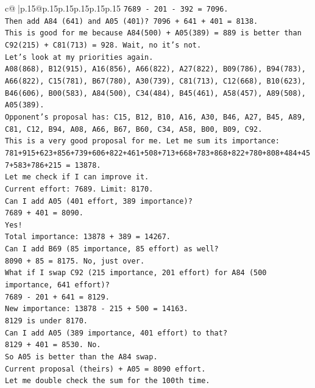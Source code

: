 \documentclass{article}
\begin{document}
{\begin{supertabular}{c@{$\;$}|p{.15\linewidth}@{}p{.15\linewidth}p{.15\linewidth}p{.15\linewidth}p{.15\linewidth}p{.15\linewidth}}
{{{\texttt{7689 {-} 201 {-} 392 = 7096.} \\
\texttt{Then add A84 (641) and A05 (401)? 7096 + 641 + 401 = 8138.} \\
\texttt{This is good for me because A84(500) + A05(389) = 889 is better than C92(215) + C81(713) = 928. Wait, no it's not.} \\
\texttt{Let's look at my priorities again.} \\
\texttt{A08(868), B12(915), A16(856), A66(822), A27(822), B09(786), B94(783), A66(822), C15(781), B67(780), A30(739), C81(713), C12(668), B10(623), B46(606), B00(583), A84(500), C34(484), B45(461), A58(457), A89(508), A05(389).} \\
\texttt{Opponent's proposal has: C15, B12, B10, A16, A30, B46, A27, B45, A89, C81, C12, B94, A08, A66, B67, B60, C34, A58, B00, B09, C92.} \\
\texttt{This is a very good proposal for me. Let me sum its importance:} \\
\texttt{781+915+623+856+739+606+822+461+508+713+668+783+868+822+780+808+484+457+583+786+215 = 13878.} \\
\texttt{Let me check if I can improve it.} \\
\texttt{Current effort: 7689. Limit: 8170.} \\
\texttt{Can I add A05 (401 effort, 389 importance)?} \\
\texttt{7689 + 401 = 8090.} \\
\texttt{Yes!} \\
\texttt{Total importance: 13878 + 389 = 14267.} \\
\texttt{Can I add B69 (85 importance, 85 effort) as well?} \\
\texttt{8090 + 85 = 8175. No, just over.} \\
\texttt{What if I swap C92 (215 importance, 201 effort) for A84 (500 importance, 641 effort)?} \\
\texttt{7689 {-} 201 + 641 = 8129.} \\
\texttt{New importance: 13878 {-} 215 + 500 = 14163.} \\
\texttt{8129 is under 8170.} \\
\texttt{Can I add A05 (389 importance, 401 effort) to that?} \\
\texttt{8129 + 401 = 8530. No.} \\
\texttt{So A05 is better than the A84 swap.} \\
\texttt{Current proposal (theirs) + A05 = 8090 effort.} \\
\texttt{Let me double check the sum for the 100th time.} \\
}}}
\end{supertabular}}
\end{document}
